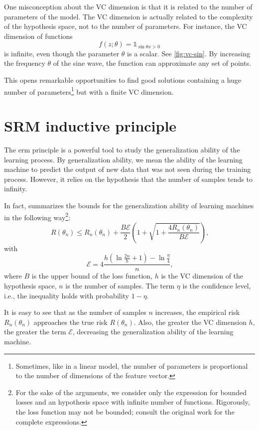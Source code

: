 One misconception about the VC dimension is that it is related to the number of parameters
of the model.  The VC dimension is actually related to the complexity of the hypothesis space, not
to the number of parameters.  For instance, the VC dimension of functions
\[
  f(z; \theta) = \mathbb{1}_{\sin \theta x > 0}
\]
is infinite, even though the parameter $\theta$ is a scalar.  See \cref{fig:vc-sin}.
By increasing the frequency $\theta$ of the sine wave, the function can approximate any set
of points.

This opens remarkable opportunities to find good solutions containing a huge number of
parameters\footnote{Sometimes, like in a linear model, the number of parameters is
proportional to the number of dimensions of the feature vector.} but with a finite VC
dimension.  %

\section{SRM inductive principle}

The \gls{erm} principle is a powerful tool to study the generalization ability of the
learning process.  By generalization ability, we mean the ability of the learning machine
to predict the output of new data that was not seen during the training process.  However,
it relies on the hypothesis that the number of samples tends to infinity.

In fact, \textcite{Vapnik1999b} summarizes the bounds for the
generalization ability of learning machines in the following way\footnote{ For the sake of
the arguments, we consider only the expression for bounded losses and an hypothesis space
with infinite number of functions.  Rigorously, the loss function may not be bounded;
consult the original work for the complete expressions.}:
\begin{equation}
  \label{eq:generalization-bound}
  R(\theta_n) \leq R_n(\theta_n) + \frac{B \mathcal{E}}{2} \left(
    1 + \sqrt{1 + \frac{4 R_n(\theta_n)}{B \mathcal{E}}}
  \right)\text{,}
\end{equation}
with
\[
  \mathcal{E} = 4 \frac{
    h \left( \ln \frac{2 n}{h} + 1 \right) - \ln \frac{\eta}{4}
  }{n}\text{,}
\]
where $B$ is the upper bound of the loss function, $h$ is the VC dimension of the
hypothesis space, $n$ is the number of samples.  The term $\eta$ is the confidence level,
i.e., the inequality holds with probability $1 - \eta$.

It is easy to see that as the number of samples $n$ increases, the empirical risk
$R_n(\theta_n)$ approaches the true risk $R(\theta_n)$.  Also, the greater the VC
dimension $h$, the greater the term $\mathcal{E}$, decreasing the generalization ability
of the learning machine.

